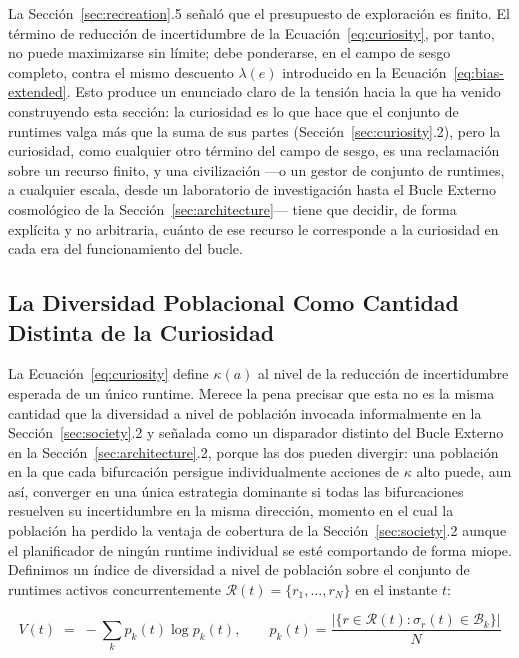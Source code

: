 \documentclass[11pt]{article}
\begin{document}
La Sección~\ref{sec:recreation}.5 señaló que el presupuesto de exploración es finito. El término de reducción de incertidumbre de la Ecuación~\ref{eq:curiosity}, por tanto, no puede maximizarse sin límite; debe ponderarse, en el campo de sesgo completo, contra el mismo descuento $\lambda(e)$ introducido en la Ecuación~\ref{eq:bias-extended}. Esto produce un enunciado claro de la tensión hacia la que ha venido construyendo esta sección: la curiosidad es lo que hace que el conjunto de runtimes valga más que la suma de sus partes (Sección~\ref{sec:curiosity}.2), pero la curiosidad, como cualquier otro término del campo de sesgo, es una reclamación sobre un recurso finito, y una civilización —o un gestor de conjunto de runtimes, a cualquier escala, desde un laboratorio de investigación hasta el Bucle Externo cosmológico de la Sección~\ref{sec:architecture}— tiene que decidir, de forma explícita y no arbitraria, cuánto de ese recurso le corresponde a la curiosidad en cada era del funcionamiento del bucle.

\subsection{La Diversidad Poblacional Como Cantidad Distinta de la Curiosidad}
\label{sec:diversity-formal}

La Ecuación~\ref{eq:curiosity} define $\kappa(a)$ al nivel de la reducción de incertidumbre esperada de un único runtime. Merece la pena precisar que esta no es la misma cantidad que la diversidad a nivel de población invocada informalmente en la Sección~\ref{sec:society}.2 y señalada como un disparador distinto del Bucle Externo en la Sección~\ref{sec:architecture}.2, porque las dos pueden divergir: una población en la que cada bifurcación persigue individualmente acciones de $\kappa$ alto puede, aun así, converger en una única estrategia dominante si todas las bifurcaciones resuelven su incertidumbre en la misma dirección, momento en el cual la población ha perdido la ventaja de cobertura de la Sección~\ref{sec:society}.2 aunque el planificador de ningún runtime individual se esté comportando de forma miope. Definimos un índice de diversidad a nivel de población sobre el conjunto de runtimes activos concurrentemente $\mathcal{R}(t) = \{r_1, \ldots, r_N\}$ en el instante $t$:

\begin{equation}
\label{eq:diversity}
V(t) \;=\; -\sum_{k} p_k(t) \log p_k(t), \qquad p_k(t) = \frac{|\{r \in \mathcal{R}(t) : \sigma_r(t) \in \mathcal{B}_k\}|}{N}
\end{equation}
\end{document}
